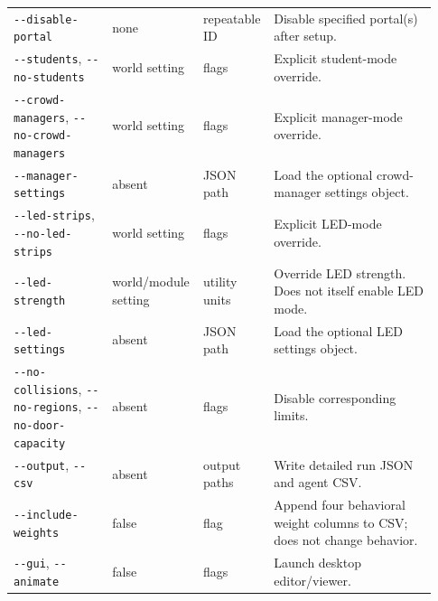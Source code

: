 \documentclass[11pt]{article}
\begin{document}
{\begin{longtable}{@{}p{0.23\linewidth}p{0.19\linewidth}p{0.13\linewidth}p{0.38\linewidth}@{}}
\texttt{-\allowbreak{}-\allowbreak{}disable-\allowbreak{}portal} & none & repeatable ID & Disable specified portal(s) after setup. \\

\texttt{-\allowbreak{}-\allowbreak{}students}, \texttt{-\allowbreak{}-\allowbreak{}no-\allowbreak{}students} & world setting & flags & Explicit student-mode override. \\

\texttt{-\allowbreak{}-\allowbreak{}crowd-\allowbreak{}managers}, \texttt{-\allowbreak{}-\allowbreak{}no-\allowbreak{}crowd-\allowbreak{}managers} & world setting & flags & Explicit manager-mode override. \\

\texttt{-\allowbreak{}-\allowbreak{}manager-\allowbreak{}settings} & absent & JSON path & Load the optional crowd-manager settings object. \\

\texttt{-\allowbreak{}-\allowbreak{}led-\allowbreak{}strips}, \texttt{-\allowbreak{}-\allowbreak{}no-\allowbreak{}led-\allowbreak{}strips} & world setting & flags & Explicit LED-mode override. \\

\texttt{-\allowbreak{}-\allowbreak{}led-\allowbreak{}strength} & world/module setting & utility units & Override LED strength. Does not itself enable LED mode. \\

\texttt{-\allowbreak{}-\allowbreak{}led-\allowbreak{}settings} & absent & JSON path & Load the optional LED settings object. \\

\texttt{-\allowbreak{}-\allowbreak{}no-\allowbreak{}collisions}, \texttt{-\allowbreak{}-\allowbreak{}no-\allowbreak{}regions}, \texttt{-\allowbreak{}-\allowbreak{}no-\allowbreak{}door-\allowbreak{}capacity} & absent & flags & Disable corresponding limits. \\

\texttt{-\allowbreak{}-\allowbreak{}output}, \texttt{-\allowbreak{}-\allowbreak{}csv} & absent & output paths & Write detailed run JSON and agent CSV. \\

\texttt{-\allowbreak{}-\allowbreak{}include-\allowbreak{}weights} & false & flag & Append four behavioral weight columns to CSV; does not change behavior. \\

\texttt{-\allowbreak{}-\allowbreak{}gui}, \texttt{-\allowbreak{}-\allowbreak{}animate} & false & flags & Launch desktop editor/viewer. \\

\end{longtable}

}
\end{document}
